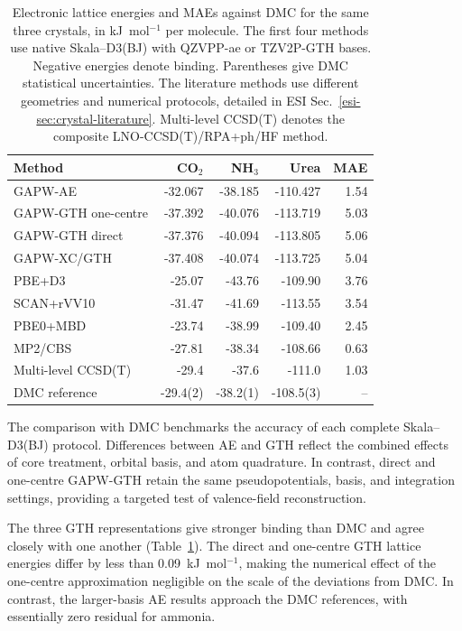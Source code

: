 \documentclass[10pt,a4paper,twocolumn]{article}
\begin{document}
\begin{table}[t]
\centering
\caption{Electronic lattice energies and MAEs against DMC for the same three crystals, in kJ~mol$^{-1}$ per molecule. The first four methods use native Skala--D3(BJ) with QZVPP-ae or TZV2P-GTH bases. Negative energies denote binding. Parentheses give DMC statistical uncertainties. The literature methods use different geometries and numerical protocols, detailed in ESI Sec.~\ref{esi-sec:crystal-literature}. Multi-level CCSD(T) denotes the composite LNO-CCSD(T)/RPA+ph/HF method.}
\label{tab:crystals}
\begin{tabular}{lrrrr}
\toprule
Method & CO$_2$ & NH$_3$ & Urea & MAE\\
\midrule
GAPW-AE & -32.067 & -38.185 & -110.427 & 1.54\\
GAPW-GTH one-centre & -37.392 & -40.076 & -113.719 & 5.03\\
GAPW-GTH direct & -37.376 & -40.094 & -113.805 & 5.06\\
GAPW-XC/GTH & -37.408 & -40.074 & -113.725 & 5.04\\
\midrule
PBE+D3\cite{DellaPia2025MLIP} & -25.07 & -43.76 & -109.90 & 3.76\\
SCAN+rVV10\cite{DellaPia2025MLIP} & -31.47 & -41.69 & -113.55 & 3.54\\
PBE0+MBD\cite{DellaPia2025MLIP} & -23.74 & -38.99 & -109.40 & 2.45\\
MP2/CBS\cite{Liang2023CrystalMP2} & -27.81 & -38.34 & -108.66 & 0.63\\
Multi-level CCSD(T)\cite{Syty2025CrystalCC} & -29.4 & -37.6 & -111.0 & 1.03\\
\midrule
DMC reference\cite{DellaPia2024X23} & -29.4(2) & -38.2(1) & -108.5(3) & --\\
\bottomrule
\end{tabular}
\end{table}

The comparison with DMC benchmarks the accuracy of each complete Skala--D3(BJ) protocol. Differences between AE and GTH reflect the combined effects of core treatment, orbital basis, and atom quadrature. In contrast, direct and one-centre GAPW-GTH retain the same pseudopotentials, basis, and integration settings, providing a targeted test of valence-field reconstruction.

The three GTH representations give stronger binding than DMC and agree closely with one another (Table~\ref{tab:crystals}). The direct and one-centre GTH lattice energies differ by less than 0.09~kJ~mol$^{-1}$, making the numerical effect of the one-centre approximation negligible on the scale of the deviations from DMC. In contrast, the larger-basis AE results approach the DMC references, with essentially zero residual for ammonia.
\end{document}
